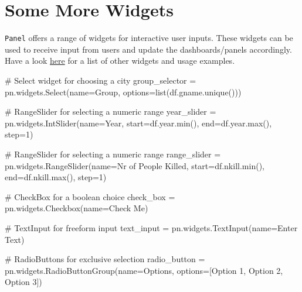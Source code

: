 \documentclass[
  letterpaper,
  DIV=11,
  numbers=noendperiod]{scrreprt}
\newenvironment{Shaded}{\begin{snugshade}}{\end{snugshade}}
\newcommand{\BuiltInTok}[1]{\textcolor[rgb]{0.00,0.23,0.31}{#1}}
\newcommand{\CommentTok}[1]{\textcolor[rgb]{0.37,0.37,0.37}{#1}}
\newcommand{\DecValTok}[1]{\textcolor[rgb]{0.68,0.00,0.00}{#1}}
\newcommand{\NormalTok}[1]{\textcolor[rgb]{0.00,0.23,0.31}{#1}}
\newcommand{\OperatorTok}[1]{\textcolor[rgb]{0.37,0.37,0.37}{#1}}
\newcommand{\StringTok}[1]{\textcolor[rgb]{0.13,0.47,0.30}{#1}}
\begin{document}
\section{Some More Widgets}\label{some-more-widgets}

\texttt{Panel} offers a range of widgets for interactive user inputs.
These widgets can be used to receive input from users and update the
dashboards/panels accordingly. Have a look
\href{https://panel.holoviz.org/reference/index.html\#widgets}{here} for
a list of other widgets and usage examples.

\begin{Shaded}
\begin{Highlighting}[]
\CommentTok{\# Select widget for choosing a city}
\NormalTok{group\_selector }\OperatorTok{=}\NormalTok{ pn.widgets.Select(name}\OperatorTok{=}\StringTok{\textquotesingle{}Group\textquotesingle{}}\NormalTok{, options}\OperatorTok{=}\BuiltInTok{list}\NormalTok{(df.gname.unique()))}

\CommentTok{\# RangeSlider for selecting a numeric range}
\NormalTok{year\_slider }\OperatorTok{=}\NormalTok{ pn.widgets.IntSlider(name}\OperatorTok{=}\StringTok{\textquotesingle{}Year\textquotesingle{}}\NormalTok{, start}\OperatorTok{=}\NormalTok{df.year.}\BuiltInTok{min}\NormalTok{(), end}\OperatorTok{=}\NormalTok{df.year.}\BuiltInTok{max}\NormalTok{(), step}\OperatorTok{=}\DecValTok{1}\NormalTok{)}

\CommentTok{\# RangeSlider for selecting a numeric range}
\NormalTok{range\_slider }\OperatorTok{=}\NormalTok{ pn.widgets.RangeSlider(name}\OperatorTok{=}\StringTok{\textquotesingle{}Nr of People Killed\textquotesingle{}}\NormalTok{, start}\OperatorTok{=}\NormalTok{df.nkill.}\BuiltInTok{min}\NormalTok{(), end}\OperatorTok{=}\NormalTok{df.nkill.}\BuiltInTok{max}\NormalTok{(), step}\OperatorTok{=}\DecValTok{1}\NormalTok{)}

\CommentTok{\# CheckBox for a boolean choice}
\NormalTok{check\_box }\OperatorTok{=}\NormalTok{ pn.widgets.Checkbox(name}\OperatorTok{=}\StringTok{\textquotesingle{}Check Me\textquotesingle{}}\NormalTok{)}

\CommentTok{\# TextInput for freeform input}
\NormalTok{text\_input }\OperatorTok{=}\NormalTok{ pn.widgets.TextInput(name}\OperatorTok{=}\StringTok{\textquotesingle{}Enter Text\textquotesingle{}}\NormalTok{)}

\CommentTok{\# RadioButtons for exclusive selection}
\NormalTok{radio\_button }\OperatorTok{=}\NormalTok{ pn.widgets.RadioButtonGroup(name}\OperatorTok{=}\StringTok{\textquotesingle{}Options\textquotesingle{}}\NormalTok{, options}\OperatorTok{=}\NormalTok{[}\StringTok{\textquotesingle{}Option 1\textquotesingle{}}\NormalTok{, }\StringTok{\textquotesingle{}Option 2\textquotesingle{}}\NormalTok{, }\StringTok{\textquotesingle{}Option 3\textquotesingle{}}\NormalTok{])}
\end{Highlighting}
\end{Shaded}
\end{document}
